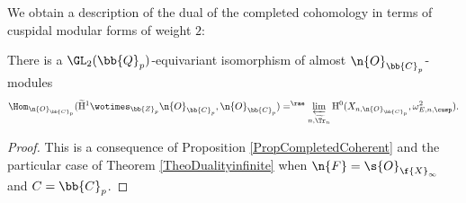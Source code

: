 We obtain a description of the dual of the completed cohomology in terms of cuspidal modular forms of weight $2$:

\begin{theo}
There is a $\GL_2(\bb{Q}_p)$-equivariant isomorphism of almost $\n{O}_{\bb{C}_p}$-modules
\[
\Hom_{\n{O}_{\bb{C}_p}} (\mathrm{\widetilde{H}}^1 \wotimes_{\bb{Z}_p}\n{O}_{\bb{C}_p} , \n{O}_{\bb{C}_p}) =^{\rae} \varprojlim_{n, \widetilde{\Tr}_n} \mathrm{H}^0(X_{n, \n{O}_{\bb{C}_p}}, \omega^2_{E,n,\cusp}).
\]
\end{theo}

\begin{proof}
This is a consequence of Proposition \ref{PropCompletedCoherent} and the particular case of Theorem \ref{TheoDualityinfinite} when $\n{F}= \s{O}_{\f{X}_{\infty}}$ and $C=\bb{C}_p$.
\end{proof}

